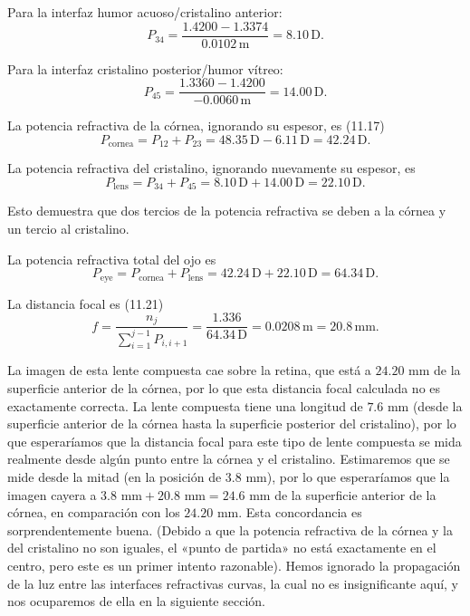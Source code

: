\documentclass[12pt]{book}
\begin{document}
Para la interfaz humor acuoso/cristalino anterior:
\begin{equation}
\label{eq:11.51}
P_{34} = \frac{1.4200 - 1.3374}{0.0102\,\text{m}} = 8.10\,\text{D}.
\end{equation}

Para la interfaz cristalino posterior/humor vítreo:
\begin{equation}
\label{eq:11.52}
P_{45} = \frac{1.3360 - 1.4200}{-0.0060\,\text{m}} = 14.00\,\text{D}.
\end{equation}

La potencia refractiva de la córnea, ignorando su espesor, es (11.17)
\begin{equation}
\label{eq:11.53}
P_{\text{cornea}} = P_{12} + P_{23} = 48.35\,\text{D} - 6.11\,\text{D} = 42.24\,\text{D}.
\end{equation}

La potencia refractiva del cristalino, ignorando nuevamente su espesor, es
\begin{equation}
\label{eq:11.54}
P_{\text{lens}} = P_{34} + P_{45} = 8.10\,\text{D} + 14.00\,\text{D} = 22.10\,\text{D}.
\end{equation}

Esto demuestra que dos tercios de la potencia refractiva se deben a la córnea y un tercio al cristalino.

La potencia refractiva total del ojo es
\begin{equation}
\label{eq:11.55}
P_{\text{eye}} = P_{\text{cornea}} + P_{\text{lens}} = 42.24\,\text{D} + 22.10\,\text{D} = 64.34\,\text{D}.
\end{equation}

La distancia focal es (11.21)
\begin{equation}
\label{eq:11.56}
f = \frac{n_j}{\sum_{i=1}^{j-1} P_{i,i+1}} = \frac{1.336}{64.34\,\text{D}} = 0.0208\,\text{m} = 20.8\,\text{mm}.
\end{equation}

La imagen de esta lente compuesta cae sobre la retina, que está a $24.20\text{ mm}$ de la superficie anterior de la córnea, por lo que esta distancia focal calculada no es exactamente correcta. La lente compuesta tiene una longitud de $7.6\text{ mm}$ (desde la superficie anterior de la córnea hasta la superficie posterior del cristalino), por lo que esperaríamos que la distancia focal para este tipo de lente compuesta se mida realmente desde algún punto entre la córnea y el cristalino. Estimaremos que se mide desde la mitad (en la posición de $3.8\text{ mm}$), por lo que esperaríamos que la imagen cayera a $3.8\text{ mm} + 20.8\text{ mm} = 24.6\text{ mm}$ de la superficie anterior de la córnea, en comparación con los $24.20\text{ mm}$. Esta concordancia es sorprendentemente buena. (Debido a que la potencia refractiva de la córnea y la del cristalino no son iguales, el «punto de partida» no está exactamente en el centro, pero este es un primer intento razonable). Hemos ignorado la propagación de la luz entre las interfaces refractivas curvas, la cual no es insignificante aquí, y nos ocuparemos de ella en la siguiente sección.
\end{document}
